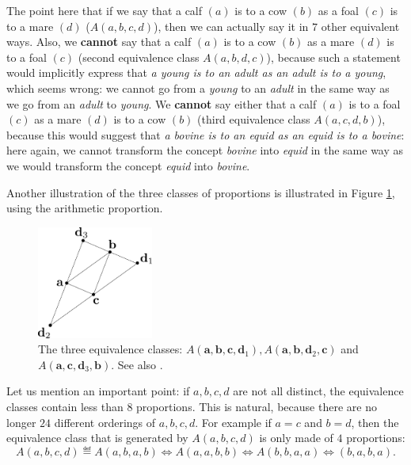 \begin{testexample}
  The point here that if we say that a calf $(a)$ is to a cow $(b)$ as a foal
  $(c)$ is to a mare $(d)$ ($A(a, b, c, d)$), then we can actually say it in
  $7$ other equivalent ways. Also, we \textbf{cannot} say that a calf $(a)$ is
  to a cow $(b)$ as a mare $(d)$ is to a foal $(c)$ (second equivalence class
  $A(a, b, d, c)$), because such a statement would implicitly express that
  \textit{a young is to an adult as an adult is to a young}, which seems wrong:
  we cannot go from a \textit{young} to an \textit{adult} in the same way as we
  go from an \textit{adult} to \textit{young}.  We \textbf{cannot} say either
  that a calf $(a)$ is to a foal $(c)$ as a  mare $(d)$  is to a cow $(b)$
  (third equivalence class $A(a, c, d, b)$), because this would suggest that
  \textit{a bovine is to an equid as an equid is to a bovine}: here again, we
  cannot transform the concept \textit{bovine} into \textit{equid} in the same
  way as we would transform the concept \textit{equid} into \textit{bovine}.
\end{testexample}

\noindent
Another illustration of the three classes of proportions is illustrated in
Figure \ref{FIG:3_classes}, using the arithmetic proportion.
\begin{figure}[!h]
\centering
  \includegraphics[width=1.5in]{figures/three_classes.pdf}
  \caption{The three equivalence classes: $A(\mathbf{a}, \mathbf{b},
  \mathbf{c}, \mathbf{d}_1), A(\mathbf{a}, \mathbf{b}, \mathbf{d}_2,
  \mathbf{c})$ and $A(\mathbf{a}, \mathbf{c}, \mathbf{d}_3,\mathbf{b})$. See
  also \cite{PraRic13LU}.}
\label{FIG:3_classes}
\end{figure}

Let us mention an important point: if $a, b, c, d$ are not all distinct, the
equivalence classes contain less than $8$ proportions. This is natural,
because there are no longer $24$ different orderings of $a, b, c, d$. For
example if $a = c$ and $b = d$, then the equivalence class that is generated by
$A(a, b, c, d)$ is only made of $4$ proportions:
$$A(a, b, c, d) \eqdef A(a, b, a, b) \iff A(a, a, b, b) \iff A(b, b, a, a) \iff
(b, a, b, a).$$


